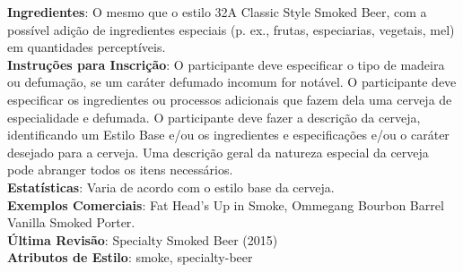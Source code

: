 \textbf{Ingredientes}: O mesmo que o estilo 32A Classic Style Smoked Beer, com a possível adição de ingredientes especiais (p. ex., frutas, especiarias, vegetais, mel) em quantidades perceptíveis. \\
\textbf{Instruções para Inscrição}: O participante deve especificar o tipo de madeira ou defumação, se um caráter defumado incomum for notável. O participante deve especificar os ingredientes ou processos adicionais que fazem dela uma cerveja de especialidade e defumada. O participante deve fazer a descrição da cerveja, identificando um Estilo Base e/ou os ingredientes e especificações e/ou o caráter desejado para a cerveja. Uma descrição geral da natureza especial da cerveja pode abranger todos os itens necessários. \\
\textbf{Estatísticas}: Varia de acordo com o estilo base da cerveja. \\
\textbf{Exemplos Comerciais}: Fat Head’s Up in Smoke, Ommegang Bourbon Barrel Vanilla Smoked Porter. \\
\textbf{Última Revisão}: Specialty Smoked Beer (2015) \\
\textbf{Atributos de Estilo}: smoke, specialty-beer
